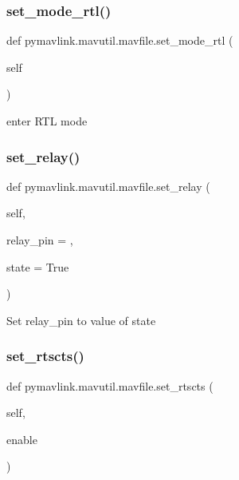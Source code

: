 \subsubsection{\texorpdfstring{set\+\_\+mode\+\_\+rtl()}{set\_mode\_rtl()}}
{\footnotesize\ttfamily def pymavlink.\+mavutil.\+mavfile.\+set\+\_\+mode\+\_\+rtl (\begin{DoxyParamCaption}\item[{}]{self }\end{DoxyParamCaption})}

\begin{DoxyVerb}enter RTL mode\end{DoxyVerb}
 \mbox{\label{classpymavlink_1_1mavutil_1_1mavfile_adefc4e0924a50a82a42a49e790cfe19a}} 
\subsubsection{\texorpdfstring{set\+\_\+relay()}{set\_relay()}}
{\footnotesize\ttfamily def pymavlink.\+mavutil.\+mavfile.\+set\+\_\+relay (\begin{DoxyParamCaption}\item[{}]{self,  }\item[{}]{relay\+\_\+pin = {},  }\item[{}]{state = {\ttfamily True} }\end{DoxyParamCaption})}

\begin{DoxyVerb}Set relay_pin to value of state\end{DoxyVerb}
 \mbox{\label{classpymavlink_1_1mavutil_1_1mavfile_a2607aae0fda1190034889d9e1c585539}} 
\subsubsection{\texorpdfstring{set\+\_\+rtscts()}{set\_rtscts()}}
{\footnotesize\ttfamily def pymavlink.\+mavutil.\+mavfile.\+set\+\_\+rtscts (\begin{DoxyParamCaption}\item[{}]{self,  }\item[{}]{enable }\end{DoxyParamCaption})}

